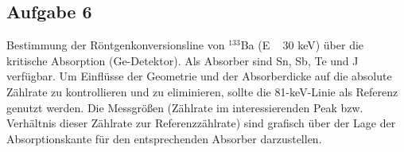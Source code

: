 \subsection*{Aufgabe 6}
Bestimmung der Röntgenkonversionsline von $^{133}$Ba (E ~ 30 keV) über die kritische Absorption (Ge-Detektor). Als Absorber sind Sn, Sb, Te und J verfügbar. Um Einflüsse der Geometrie und der Absorberdicke auf die absolute Zählrate zu kontrollieren und zu eliminieren, sollte die 81-keV-Linie als Referenz genutzt werden. Die Messgrößen (Zählrate im interessierenden Peak bzw. Verhältnis dieser Zählrate zur Referenzzählrate) sind grafisch über der Lage der Absorptionskante für den entsprechenden Absorber darzustellen.
